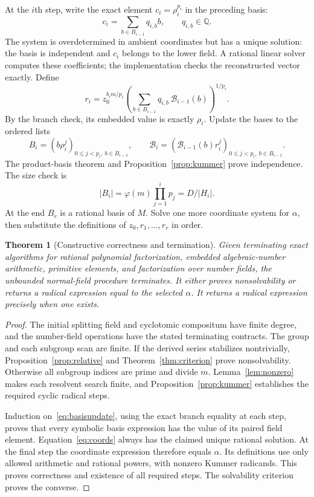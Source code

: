 \documentclass[11pt,a4paper]{article}
\newcommand{\Q}{\mathbb Q}
\newtheorem{theorem}{Theorem}[section]
\theoremstyle{definition}
\begin{document}
At the $i$th step, write the exact element $c_i=\rho_i^{p_i}$ in the preceding
basis:
\begin{equation}\label{eq:coords}
 c_i=\sum_{b\in B_{i-1}}q_{i,b}b,\qquad q_{i,b}\in\Q.
\end{equation}
The system is overdetermined in ambient coordinates but has a unique solution:
the basis is independent and $c_i$ belongs to the lower field. A rational
linear solver computes these coefficients; the implementation checks the
reconstructed vector exactly. Define
\begin{equation}\label{eq:definition}
 r_i=z_0^{b_i m/p_i}
 \left(\sum_{b\in B_{i-1}}q_{i,b}\,\mathcal B_{i-1}(b)\right)^{1/p_i}.
\end{equation}
By the branch check, its embedded value is exactly $\rho_i$.
Update the bases to the ordered lists
\begin{equation}\label{eq:basisupdate}
 B_i=(b\rho_i^j)_{0\le j<p_i,\ b\in B_{i-1}},\qquad
 \mathcal B_i=(\mathcal B_{i-1}(b)r_i^j)_{0\le j<p_i,\ b\in B_{i-1}}.
\end{equation}
The product-basis theorem and Proposition~\ref{prop:kummer} prove independence.
The size check is
\[
 |B_i|=\varphi(m)\prod_{j=1}^i p_j=D/|H_i|.
\]
At the end $B_r$ is a rational basis of $M$. Solve one more coordinate system
for $\alpha$, then substitute the definitions of $z_0,r_1,\ldots,r_r$ in order.

\begin{theorem}[Constructive correctness and termination]\label{thm:main}
Given terminating exact algorithms for rational polynomial factorization,
embedded algebraic-number arithmetic, primitive elements, and factorization
over number fields, the unbounded normal-field procedure terminates. It either
proves nonsolvability or returns a radical expression equal to the selected
$\alpha$. It returns a radical expression precisely when one exists.
\end{theorem}
\begin{proof}
The initial splitting field and cyclotomic compositum have finite degree, and
the number-field operations have the stated terminating contracts. The group
and each subgroup scan are finite. If the derived series stabilizes
nontrivially, Proposition~\ref{prop:relative} and Theorem~\ref{thm:criterion}
prove nonsolvability. Otherwise all subgroup indices are prime and divide $m$.
Lemma~\ref{lem:nonzero} makes each resolvent search finite, and
Proposition~\ref{prop:kummer} establishes the required cyclic radical steps.

Induction on~\eqref{eq:basisupdate}, using the exact branch equality at each
step, proves that every symbolic basis expression has the value of its paired
field element. Equation~\eqref{eq:coords} always has the claimed unique rational
solution. At the final step the coordinate expression therefore equals
$\alpha$. Its definitions use only allowed arithmetic and rational powers,
with nonzero Kummer radicands. This proves correctness and existence of all
required steps. The solvability criterion proves the converse.
\end{proof}
\end{document}

